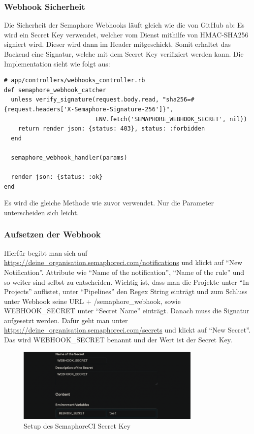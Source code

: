 \subsubsection{Webhook Sicherheit}
Die Sicherheit der Semaphore Webhooks läuft gleich wie die von GitHub ab: Es wird ein Secret Key verwendet,
welcher vom Dienst mithilfe von HMAC-SHA256 signiert wird. Dieser wird dann im Header mitgeschickt. Somit erhaltet
das Backend eine Signatur, welche mit dem Secret Key verifiziert werden kann. \newline
Die Implementation sieht wie folgt aus:
\begin{codebox}[]
  \begin{verbatim}
# app/controllers/webhooks_controller.rb
def semaphore_webhook_catcher
  unless verify_signature(request.body.read, "sha256=#{request.headers['X-Semaphore-Signature-256']}",
                          ENV.fetch('SEMAPHORE_WEBHOOK_SECRET', nil))
    return render json: {status: 403}, status: :forbidden
  end

  semaphore_webhook_handler(params)

  render json: {status: :ok}
end
  \end{verbatim}
\end{codebox}
Es wird die gleiche  Methode wie zuvor verwendet. Nur die Parameter
unterscheiden sich leicht.

\subsubsection{Aufsetzen der Webhook}
Hierfür begibt man sich auf \url{https://deine_organisation.semaphoreci.com/notifications} und klickt auf 
\enquote{New Notification}. Attribute wie \enquote{Name of the notification}, \enquote{Name of the rule} und so weiter
sind selbst zu entscheiden. Wichtig ist, dass man die Projekte unter \enquote{In Projects} auflistet, unter 
\enquote{Pipelines} den Regex String  einträgt und zum Schluss unter Webhook
seine URL + /semaphore\_webhook, sowie WEBHOOK\_SECRET unter \enquote{Secret Name} einträgt. \newline
Danach muss die Signatur aufgesetzt werden. Dafür geht man unter
\url{https://deine_organisation.semaphoreci.com/secrets} und klickt auf \enquote{New Secret}. Das wird WEBHOOK\_SECRET
benannt und der Wert ist der Secret Key.
\begin{figure}[H]
  \centering
  \includegraphics[width=0.8\textwidth]{images/misc/setup_semaphore_webhook.png}
  \caption[Screenshot des Setups des SemaphoreCI Secret Key]{Setup des SemaphoreCI Secret Key}
  \label{fig:setup_semaphore_webhook}
\end{figure}


